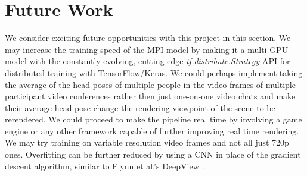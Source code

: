 \section{Future Work}\label{sec:future-work}

We consider exciting future opportunities with this project in this section. We may increase the training speed of the MPI model by making it a multi-GPU model with the constantly-evolving, cutting-edge \textit{tf.distribute.Strategy} API for distributed training with TensorFlow/Keras. We could perhaps implement taking the average of the head poses of multiple people in the video frames of multiple-participant video conferences rather then just one-on-one video chats and make their average head pose change the rendering viewpoint of the scene to be rerendered. We could proceed to make the pipeline real time by involving a game engine or any other framework capable of further improving real time rendering. We may try training on variable resolution video frames and not all just 720p ones. Overfitting can be further reduced by using a CNN in place of the gradient descent algorithm, similar to Flynn et al.'s DeepView~\cite{flynn_deepview_2019}.











